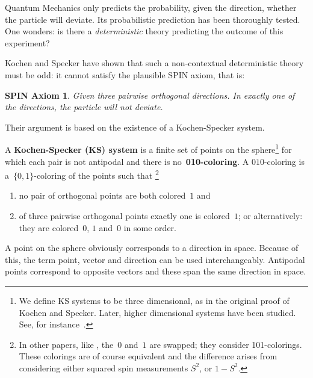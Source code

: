 \documentclass{report}
\newcommand{\keyword}[1]{\textbf{#1}}
\newtheorem{spin}{SPIN Axiom \cite{ck09}}[section]
\begin{document}
Quantum Mechanics only predicts the probability, given the direction,
whether the particle will deviate.
Its probabilistic prediction has been thoroughly tested.
One wonders: is there a
\emph{deterministic} theory predicting the
outcome of this experiment?

Kochen and Specker have shown that such a non-contextual deterministic
theory must be odd: it cannot satisfy the plausible SPIN
axiom, that is:
\begin{spin} %
    Given three pairwise orthogonal directions.
    In exactly one of the directions, the particle will not deviate.
\end{spin}
Their argument is based on the existence of a Kochen-Specker system.
\begin{definition}
    A \keyword{Kochen-Specker (KS) system} is
    a finite set of points on the sphere\footnote{
            We define KS systems to be three dimensional,
            as in the original proof of Kochen and Specker.
            Later, higher dimensional systems have been studied.
            See, for instance~\cite[p.~201]{qtcm}.
        }
    for which each pair is not antipodal and
    there is no~\keyword{010-coloring}.
    A $010$-coloring is a~$\{0,1\}$-coloring of the points such that%
        \footnote{
                In other papers, like \cite{aow11},
                the~$0$ and~$1$ are swapped; they consider 101-colorings.
                These colorings are of course equivalent and the
                difference arises from considering either squared
                spin measurements $S^2$, or $1-S^2$.
               	}
    \begin{enumerate}
        \item
            no pair of orthogonal points are both colored~$1$ and
        \item
            of three pairwise orthogonal points exactly one is colored~$1$;
            or alternatively: they are colored~$0$, $1$ and~$0$ in some order.
    \end{enumerate}
\end{definition}
A point on the sphere obviously corresponds to a direction in space.
Because of this, the term point, vector and direction
can be used interchangeably. Antipodal points correspond to opposite
vectors and these span the same direction in space.
\end{document}
